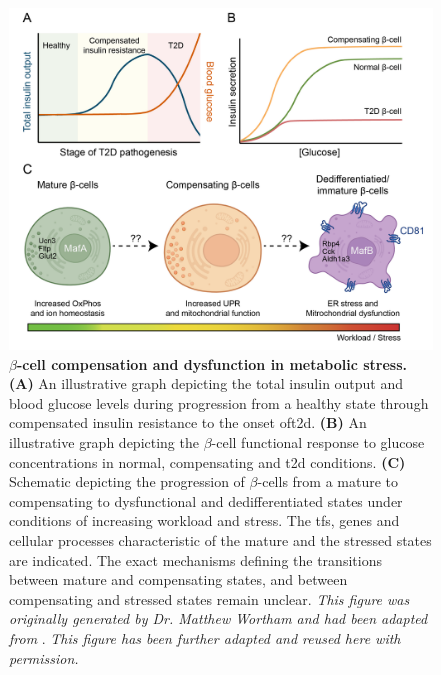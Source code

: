 \begin{figure}[H]
    \centering
    \includegraphics[width=\linewidth]{Chapter1/Fig/F1-17-01.png}
    \caption[$\beta$-cell compensation and dysfunction in metabolic stress]{\textbf{$\beta$-cell compensation and dysfunction in metabolic stress.} \textbf{(A)} An illustrative graph depicting the total insulin output and blood glucose levels during progression from a healthy state through compensated insulin resistance to the onset of\gls{t2d}. \textbf{(B)} An illustrative graph depicting the $\beta$-cell functional response to glucose concentrations in normal, compensating and \gls{t2d} conditions. \textbf{(C)} Schematic depicting the progression of $\beta$-cells from a mature to compensating to dysfunctional and dedifferentiated states under conditions of increasing workload and stress. The \glspl{tf}, genes and cellular processes characteristic of the mature and the stressed states are indicated. The exact mechanisms defining the transitions between mature and compensating states, and between compensating and stressed states remain unclear. \textit{This figure was originally generated by Dr. Matthew Wortham and had been adapted from} \textbf{\cite{defronzo_triumvirate_2009,ferrannini_stunned_2010,avrahami_single-cell_2020,sachs_targeted_2020,salinno_cd81_2021,hrovatin_delineating_2023}}. \textit{This figure has been further adapted and reused here with permission.}}
    \label{fig:chp1_adaptstress}
\end{figure}


